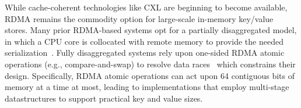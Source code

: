 While cache-coherent technologies like CXL are beginning to
become available, RDMA remains the commodity option for
large-scale in-memory key/value stores.
%
Many prior RDMA-based systems opt for a partially
disaggregated model, in which a CPU core is collocated with
remote memory to provide the needed
serialization~\cite{erpc,herd,pilaf,cell,clover,sherman}.
%
%
Fully disaggregated systems rely upon one-sided RDMA atomic
operations (e.g., compare-and-swap) to resolve data
races~\cite{rolex,fusee,race} which constrains their design.
Specifically, RDMA atomic operations can act upon 64 contiguous bits
of memory at a time at most, leading to implementations that employ
multi-stage datastructures to support practical key and value sizes.

